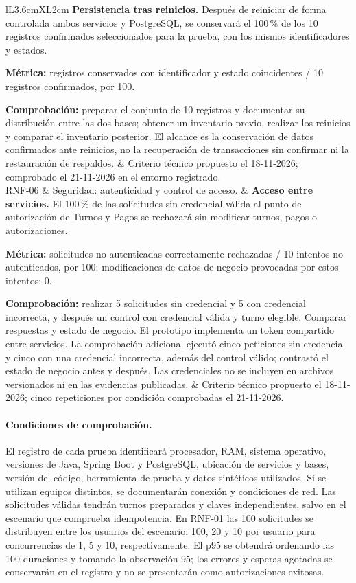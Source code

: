 \documentclass[11pt,a4paper]{article}
\begin{document}
\begin{xltabular}{\textwidth}{lL{3.6cm}XL{2cm}}
		\textbf{Persistencia tras reinicios.} Después de reiniciar de forma controlada ambos servicios y PostgreSQL, se conservará el 100\,\% de los 10 registros confirmados seleccionados para la prueba, con los mismos identificadores y estados.\par
		\textbf{Métrica:} registros conservados con identificador y estado coincidentes / 10 registros confirmados, por 100.\par
		\textbf{Comprobación:} preparar el conjunto de 10 registros y documentar su distribución entre las dos bases; obtener un inventario previo, realizar los reinicios y comparar el inventario posterior. El alcance es la conservación de datos confirmados ante reinicios, no la recuperación de transacciones sin confirmar ni la restauración de respaldos. &
		Criterio técnico propuesto el 18-11-2026; comprobado el 21-11-2026 en el entorno registrado. \\
		RNF-06 & Seguridad: autenticidad y control de acceso. &
		\textbf{Acceso entre servicios.} El 100\,\% de las solicitudes sin credencial válida al punto de autorización de Turnos y Pagos se rechazará sin modificar turnos, pagos o autorizaciones.\par
		\textbf{Métrica:} solicitudes no autenticadas correctamente rechazadas / 10 intentos no autenticados, por 100; modificaciones de datos de negocio provocadas por estos intentos: 0.\par
		\textbf{Comprobación:} realizar 5 solicitudes sin credencial y 5 con credencial incorrecta, y después un control con credencial válida y turno elegible. Comparar respuestas y estado de negocio. El prototipo implementa un token compartido entre servicios. La comprobación adicional ejecutó cinco peticiones sin credencial y cinco con una credencial incorrecta, además del control válido; contrastó el estado de negocio antes y después. Las credenciales no se incluyen en archivos versionados ni en las evidencias publicadas. &
		Criterio técnico propuesto el 18-11-2026; cinco repeticiones por condición comprobadas el 21-11-2026. \\
	\end{xltabular}
	
	\paragraph{Condiciones de comprobación.}
	El registro de cada prueba identificará procesador, RAM, sistema operativo, versiones de Java, Spring Boot y PostgreSQL, ubicación de servicios y bases, versión del código, herramienta de prueba y datos sintéticos utilizados. Si se utilizan equipos distintos, se documentarán conexión y condiciones de red. Las solicitudes válidas tendrán turnos preparados y claves independientes, salvo en el escenario que comprueba idempotencia. En RNF-01 las 100 solicitudes se distribuyen entre los usuarios del escenario: 100, 20 y 10 por usuario para concurrencias de 1, 5 y 10, respectivamente. El p95 se obtendrá ordenando las 100 duraciones y tomando la observación 95; los errores y esperas agotadas se conservarán en el registro y no se presentarán como autorizaciones exitosas.
	
\end{document}

